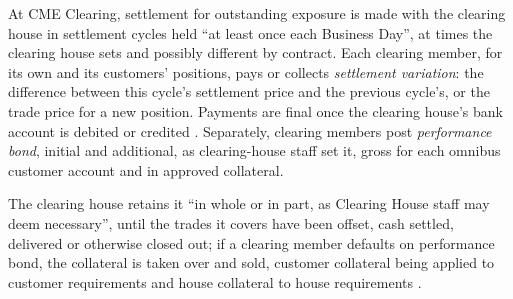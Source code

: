\begin{qfmechanism}\label{mech:futures-margin-settlement}
 At CME Clearing, settlement for outstanding exposure is made with the clearing house in settlement cycles held ``at least once each Business Day'', at times the clearing house sets and possibly different by contract. Each clearing member, for its own and its customers' positions, pays or collects \emph{settlement variation}: the difference between this cycle's settlement price and the previous cycle's, or the trade price for a new position. Payments are final once the clearing house's bank account is debited or credited \citep[Rule~814]{cme-rulebook-ch8}. Separately, clearing members post \emph{performance bond}, initial and additional, as clearing-house staff set it, gross for each omnibus customer account and in approved collateral.

The clearing house retains it ``in whole or in part, as Clearing House staff may deem necessary'', until the trades it covers have been offset, cash settled, delivered or otherwise closed out; if a clearing member defaults on performance bond, the collateral is taken over and sold, customer collateral being applied to customer requirements and house collateral to house requirements \citep[Rule~820]{cme-rulebook-ch8}.


\end{qfmechanism}
